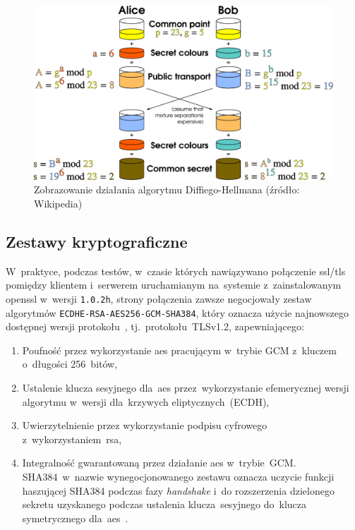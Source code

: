 \documentclass[thesis]{subfiles}
\begin{document}
\begin{figure}
	\centering
	\includegraphics[width=\textwidth]{img/Diffie-Hellman_Key_Exchange_desc}
	\caption{Zobrazowanie działania algorytmu Diffiego-Hellmana (źródło: Wikipedia)}
	\label{fig:dh}
\end{figure}


\subsection{Zestawy kryptograficzne}

W~praktyce, podczas testów, w~czasie których nawiązywano połączenie \gls{ssl/tls} pomiędzy klientem i~serwerem uruchamianym na~systemie z~zainstalowanym \gls{openssl} w~wersji \texttt{1.0.2h}, strony połączenia zawsze negocjowały zestaw algorytmów \texttt{ECDHE-RSA-AES256-GCM-SHA384}, który oznacza użycie najnowszego dostępnej wersji protokołu~, tj.~protokołu~TLSv1.2, zapewniającego:
\begin{enumerate}
\item Poufność przez wykorzystanie \gls{aes} pracującym w~trybie GCM z~kluczem o~długości 256~bitów,
\item Ustalenie klucza sesyjnego dla~\gls{aes} przez~wykorzystanie efemerycznej wersji algorytmu  w~wersji dla~krzywych eliptycznych~(ECDH),
\item Uwierzytelnienie przez wykorzystanie podpisu cyfrowego z~wykorzystaniem~\gls{rsa},
\item Integralność gwarantowaną przez działanie \gls{aes} w~trybie~GCM. SHA384~w~nazwie wynegocjonowanego zestawu oznacza uczycie funkcji haszującej SHA384 podczas fazy \emph{handshake} i~do rozszerzenia dzielonego sekretu uzyskanego podczas ustalenia klucza~sesyjnego do~klucza symetrycznego dla~\gls{aes}~\cite{stack:openssl-sha-gcm}.
\end{enumerate}
\end{document}
